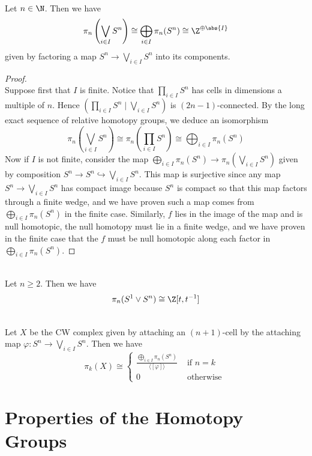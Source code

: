 \documentclass[a4paper]{article}
\begin{document}
\begin{eg}{}{}\\
Let $n\in\N$. Then we have $$\pi_n\left(\bigvee_{i\in I}S^n\right)\cong\bigoplus_{i\in I}\pi_n(S^n)\cong\Z^{\oplus\abs{I}}$$ given by factoring a map $S^n\to\bigvee_{i\in I}S^n$ into its components. 
\begin{proof}\\
Suppose first that $I$ is finite. Notice that $\prod_{i\in I}S^n$ has cells in dimensions a multiple of $n$. Hence $\left(\prod_{i\in I}S^n\;|\;\bigvee_{i\in I}S^n\right)$ is $(2n-1)$-connected. By the long exact sequence of relative homotopy groups, we deduce an isomorphism $$\pi_n\left(\bigvee_{i\in I}S^n\right)\cong\pi_n\left(\prod_{i\in I}S^n\right)\cong\bigoplus_{i\in I}\pi_n(S^n)$$ Now if $I$ is not finite, consider the map $\bigoplus_{i\in I}\pi_n(S^n)\to\pi_n\left(\bigvee_{i\in I}S^n\right)$ given by composition $S^n\to S^n\hookrightarrow\bigvee_{i\in I}S^n$. This map is surjective since any map $S^n\to\bigvee_{i\in I}S^n$ has compact image because $S^n$ is compact so that this map factors through a finite wedge, and we have proven such a map comes from $\bigoplus_{i\in I}\pi_n(S^n)$ in the finite case. Similarly, $f$ lies in the image of the map and is null homotopic, the null homotopy must lie in a finite wedge, and we have proven in the finite case that the $f$ must be null homotopic along each factor in $\bigoplus_{i\in I}\pi_n(S^n)$. 
\end{proof}
\end{eg}

\begin{eg}{}{}\\
Let $n\geq 2$. Then we have $$\pi_n(S^1\vee S^n)\cong\Z[t,t^{-1}]$$
\end{eg}

\begin{eg}{}{}\\
Let $X$ be the CW complex given by attaching an $(n+1)$-cell by the attaching map $\varphi:S^n\to\bigvee_{i\in I}S^n$. Then we have $$\pi_k(X)\cong\begin{cases}
\frac{\bigoplus_{i\in I}\pi_n(S^n)}{\langle[\varphi]\rangle} & \text{ if }n=k\\
0 & \text{ otherwise }
\end{cases}$$
\end{eg}

\pagebreak
\section{Properties of the Homotopy Groups}
\end{document}
